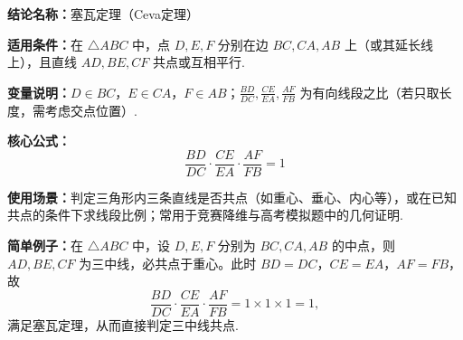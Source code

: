 \textbf{结论名称：}塞瓦定理（Ceva定理）

\textbf{适用条件：}在 $\triangle ABC$ 中，点 $D,E,F$ 分别在边 $BC,CA,AB$ 上（或其延长线上），且直线 $AD,BE,CF$ 共点或互相平行.

\textbf{变量说明：}$D\in BC$，$E\in CA$，$F\in AB$；$\frac{BD}{DC},\frac{CE}{EA},\frac{AF}{FB}$ 为有向线段之比（若只取长度，需考虑交点位置）.

\textbf{核心公式：}
\[
\boxed{\frac{BD}{DC}\cdot\frac{CE}{EA}\cdot\frac{AF}{FB}=1}
\]

\textbf{使用场景：}判定三角形内三条直线是否共点（如重心、垂心、内心等），或在已知共点的条件下求线段比例；常用于竞赛降维与高考模拟题中的几何证明.

\textbf{简单例子：}在 $\triangle ABC$ 中，设 $D,E,F$ 分别为 $BC,CA,AB$ 的中点，则 $AD,BE,CF$ 为三中线，必共点于重心。此时 $BD=DC$，$CE=EA$，$AF=FB$，故
\[
\frac{BD}{DC}\cdot\frac{CE}{EA}\cdot\frac{AF}{FB}=1\times1\times1=1,
\]
满足塞瓦定理，从而直接判定三中线共点.